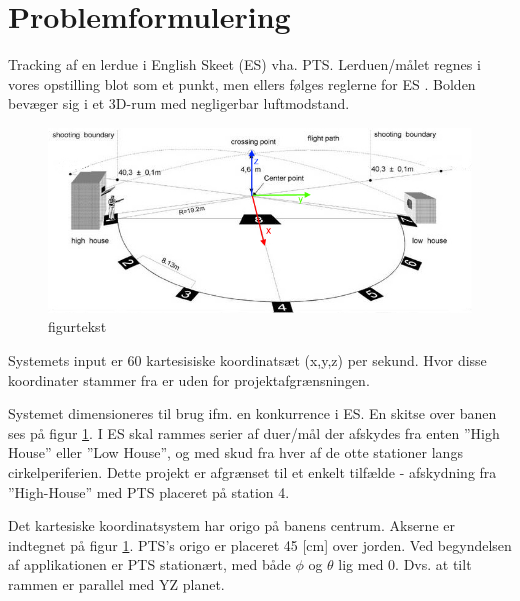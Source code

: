 \section{Problemformulering}
Tracking af en lerdue i English Skeet (ES) vha. PTS. 
Lerduen/målet regnes i vores opstilling blot som et punkt, men ellers følges reglerne for ES \citep{ES_regler}.
Bolden bevæger sig i et 3D-rum med negligerbar luftmodstand. 

\begin{figure}[th!]
\centering
\includegraphics[width=1\textwidth]{./graphics/skeet_diagram_cropped_axes}
\caption[tekst i indholdsfortegnelsen]{figurtekst}
\label{fig:ES}
\end{figure}	
Systemets input er 60 kartesisiske koordinatsæt (x,y,z) per sekund. Hvor disse 
koordinater stammer fra er uden for projektafgrænsningen. 

Systemet dimensioneres til brug ifm. en konkurrence i ES. En skitse over 
banen ses på figur \ref{fig:ES}.
I ES skal rammes serier af duer/mål der afskydes fra 
enten ”High House” eller ”Low House”, og med skud fra hver af de otte stationer langs 
cirkelperiferien. Dette projekt er afgrænset til et enkelt tilfælde - afskydning fra ”High-House” med PTS placeret på station 4. 

Det kartesiske koordinatsystem har origo på banens centrum. Akserne er indtegnet på figur \ref{fig:ES}. PTS's origo er placeret 45 [cm] over jorden. Ved begyndelsen af applikationen er PTS stationært, med både $\phi$ og $\theta$ lig med 0. Dvs. at tilt rammen er parallel med YZ planet. 



